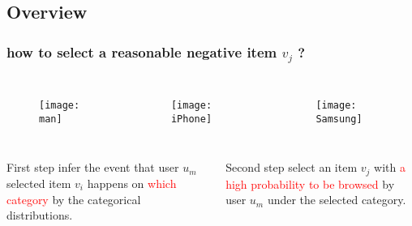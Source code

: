 \subsection*{Overview}


\begin{frame}
	\frametitle{how to select a reasonable negative item $v_j$ ?}
	\vspace{-2em}
	\begin{columns}
		\column{3cm}
		\begin{figure}
			\texttt{[image: man]}
		\end{figure}
		\column{3cm}
		\begin{figure}
			\texttt{[image: iPhone]}
		\end{figure}
		\column{4cm}
		\begin{figure}
			\texttt{[image: Samsung]}
		\end{figure}
	\end{columns}
	\vspace{.5em}
	\begin{columns}
		\pause
		\column{.5\textwidth}
		\begin{block}{First step}
			infer the event that user $u_m$ selected item
			$v_i$ happens on \textcolor{red}{which category}  by the categorical distributions.
		\end{block}
		\column{.5\textwidth}
		\pause
		\begin{block}{Second step}
			select an item $v_j$ with \textcolor{red}{a high probability to be browsed} by user $u_m$ under the selected category.
		\end{block}
	\end{columns}
\end{frame}


